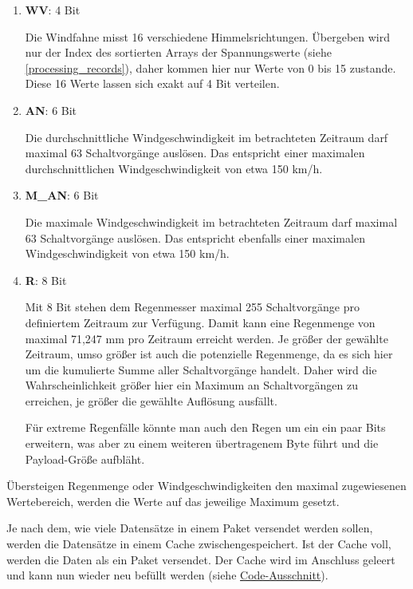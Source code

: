 \documentclass[12pt]{article}
\begin{document}
      \begin{enumerate}
        \item \textbf{WV}: 4 Bit
        
        Die Windfahne misst 16 verschiedene Himmelsrichtungen.
        Übergeben wird nur der Index des sortierten Arrays der Spannungswerte (siehe \underline{\ref{processing_records}}), daher kommen hier nur Werte von 0 bis 15 zustande.
        Diese 16 Werte lassen sich exakt auf 4 Bit verteilen.

        \item \textbf{AN}: 6 Bit
        
        Die durchschnittliche Windgeschwindigkeit im betrachteten Zeitraum darf maximal 63 Schaltvorgänge auslösen.
        Das entspricht einer maximalen durchschnittlichen Windgeschwindigkeit von etwa 150 km/h.

        \item \textbf{M\_AN}: 6 Bit
        
        Die maximale Windgeschwindigkeit im betrachteten Zeitraum darf maximal 63 Schaltvorgänge auslösen.
        Das entspricht ebenfalls einer maximalen Windgeschwindigkeit von etwa 150 km/h.

        \item \textbf{R}: 8 Bit
        
        Mit 8 Bit stehen dem Regenmesser maximal 255 Schaltvorgänge pro definiertem Zeitraum zur Verfügung.
        Damit kann eine Regenmenge von maximal 71,247 mm pro Zeitraum erreicht werden.
        Je größer der gewählte Zeitraum, umso größer ist auch die potenzielle Regenmenge, da es sich hier um die kumulierte Summe aller Schaltvorgänge handelt.
        Daher wird die Wahrscheinlichkeit größer hier ein Maximum an Schaltvorgängen zu erreichen, je größer die gewählte Auflösung ausfällt.

        Für extreme Regenfälle könnte man auch den Regen um ein ein paar Bits erweitern, was aber zu einem weiteren übertragenem Byte führt
        und die Payload-Größe aufbläht.
  
      \end{enumerate}

      Übersteigen Regenmenge oder Windgeschwindigkeiten den maximal zugewiesenen Wertebereich, werden die Werte auf das jeweilige Maximum gesetzt.

      Je nach dem, wie viele Datensätze in einem Paket versendet werden sollen, werden die Datensätze in einem Cache zwischengespeichert.
      Ist der Cache voll, werden die Daten als ein Paket versendet.
      Der Cache wird im Anschluss geleert und kann nun wieder neu befüllt werden (siehe \href{https://github.com/HTWDD-RN/ps21-LoRa/blob/9c012bc1d41e960b6edf9e756e8948e387f28c83/src/lora_weather_station/lora_weather_station.ino#L154}{Code-Ausschnitt}).
\end{document}
